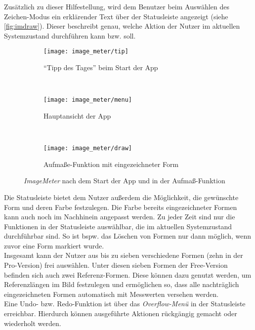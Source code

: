 Zusätzlich zu dieser Hilfestellung, wird dem Benutzer beim Auswählen des Zeichen-Modus ein erklärender Text über der Statusleiste angezeigt (siehe \autoref{fig:imdraw}).
Dieser beschreibt genau, welche Aktion der Nutzer im aktuellen Systemzustand durchführen kann bzw. soll. \\

\begin{figure}[h]
  \begin{subfigure}[t]{0.3\textwidth}
    \centering
    \texttt{[image: image\_meter/tip]}
    \caption{``Tipp des Tages'' beim Start der App}
    \label{fig:imtip}	
  \end{subfigure}
  ~
  \begin{subfigure}[t]{0.3\textwidth}
    \centering
    \texttt{[image: image\_meter/menu]}
    \caption{Hauptansicht der App}
    \label{fig:immenu}	
  \end{subfigure}
  ~
  \begin{subfigure}[t]{0.3\textwidth}
    \centering
    \texttt{[image: image\_meter/draw]}
    \caption{Aufmaße-Funktion mit eingezeichneter Form} 
    \label{fig:imdraw}	
  \end{subfigure}
  \centering
  \caption{\emph{ImageMeter} nach dem Start der App und in der Aufmaß-Funktion}
\end{figure}

\noindent
Die Statusleiste bietet dem Nutzer außerdem die Möglichkeit, die gewünschte Form und deren Farbe festzulegen.
Die Farbe bereits eingezeichneter Formen kann auch noch im Nachhinein angepasst werden.
Zu jeder Zeit sind nur die Funktionen in der Statusleiste auswählbar, die im aktuellen Systemzustand durchführbar sind.
So ist bspw. das Löschen von Formen nur dann möglich, wenn zuvor eine Form markiert wurde. \\

Insgesamt kann der Nutzer aus bis zu sieben verschiedene Formen (zehn in der Pro-Version) frei auswählen.
Unter diesen sieben Formen der Free-Version befinden sich auch zwei Referenz-Formen.
Diese können dazu genutzt werden, um Referenzlängen im Bild festzulegen und ermöglichen so, dass alle nachträglich eingezeichneten Formen automatisch mit Messwerten versehen werden. \\

Eine Undo- bzw. Redo-Funktion ist über das \emph{Overflow-Menü} in der Statusleiste erreichbar.
Hierdurch können ausgeführte Aktionen rückgängig gemacht oder wiederholt werden. \\

